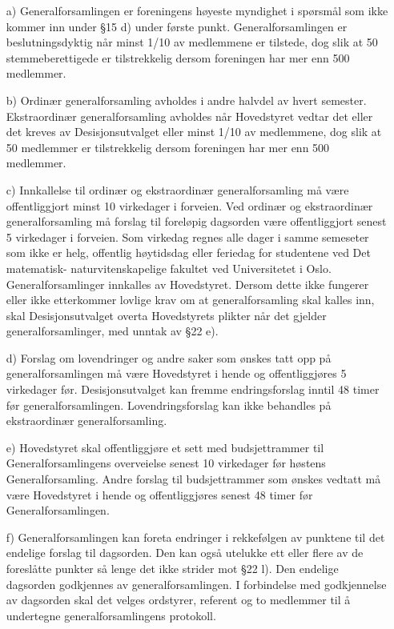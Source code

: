 \begin{itemize}
\item[a)] Generalforsamlingen er foreningens høyeste myndighet i spørsmål som
ikke kommer inn under §15 d) under første punkt. Generalforsamlingen er
beslutningsdyktig når minst 1/10 av medlemmene er tilstede, dog slik
at 50 stemmeberettigede er tilstrekkelig dersom foreningen har mer enn
500 medlemmer.

\item[b)] Ordinær generalforsamling avholdes i andre halvdel av hvert 
semester.  Ekstraordinær generalforsamling avholdes når Hovedstyret 
vedtar det eller det kreves av Desisjonsutvalget eller minst 1/10 av 
medlemmene, dog slik at 50 medlemmer er tilstrekkelig dersom foreningen 
har mer enn 500 medlemmer.

\item[c)] Innkallelse til ordinær og ekstraordinær generalforsamling må være
offentliggjort minst 10 virkedager i forveien.  Ved ordinær og ekstraordinær
generalforsamling må forslag til foreløpig dagsorden være offentliggjort 
senest 5 virkedager i forveien.  Som virkedag regnes alle dager i samme 
semeseter som ikke er helg, offentlig høytidsdag eller feriedag for 
studentene ved Det matematisk- naturvitenskapelige fakultet ved 
Universitetet i Oslo.  Generalforsamlinger innkalles av Hovedstyret.  
Dersom dette ikke fungerer eller ikke etterkommer lovlige krav om at 
generalforsamling skal kalles inn, skal Desisjonsutvalget overta 
Hovedstyrets plikter når det gjelder generalforsamlinger, med unntak av 
§22 e).

\item[d)] Forslag om lovendringer og andre saker som ønskes tatt opp på
generalforsamlingen må være Hovedstyret i hende og offentliggjøres 5
virkedager før.  Desisjonsutvalget kan fremme endringsforslag inntil 48
timer før generalforsamlingen.  Lovendringsforslag kan ikke behandles
på ekstraordinær generalforsamling.

\item[e)] Hovedstyret skal offentliggjøre et sett med budsjettrammer til
Generalforsamlingens overveielse senest 10 virkedager før høstens
Generalforsamling.  Andre forslag til budsjettrammer som ønskes
vedtatt må være Hovedstyret i hende og offentliggjøres senest 48
timer før Generalforsamlingen.

\item[f)] Generalforsamlingen kan foreta endringer i rekkefølgen av punktene
til det endelige forslag til dagsorden.  Den kan også utelukke ett
eller flere av de foreslåtte punkter så lenge det ikke strider mot
§22 l).  Den endelige dagsorden godkjennes av generalforsamlingen.  I
forbindelse med godkjennelse av dagsorden skal det velges ordstyrer,
referent og to medlemmer til å undertegne generalforsamlingens
protokoll.


\end{itemize}

